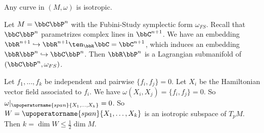   \begin{example}
    Any curve in $(M, \omega)$ is isotropic.
  \end{example}

  \begin{example}
    Let $M = \bbC\bbP^n$ with the Fubini-Study symplectic form $\omega_{FS}$.
    Recall that $\bbC\bbP^n$ parametrizes complex lines in $\bbC^{n+1}$.
    We have an embedding $\bbR^{n+1} \hookrightarrow \bbR^{n+1} \ten_\bbR \bbC = \bbC^{n+1}$, which induces an embedding $\bbR\bbP^n \hookrightarrow \bbC\bbP^n$.
    Then $\bbR\bbP^n$ is a Lagrangian submanifold of $(\bbC\bbP^n, \omega_{FS})$.
  \end{example}

  Let $f_1, \ldots, f_k$ be independent and pairwise $\{f_i, f_j\} = 0$.
  Let $X_i$ be the Hamiltonian vector field associated to $f_i$.
  We have $\omega(X_i, X_j) = \{f_i, f_j\} = 0$.
  So $\omega|_{\upoperatorname{span}\{X_1, \ldots, X_k\}} = 0$.
  So $W = \upoperatorname{span}\{X_1, \ldots, X_k\}$ is an isotropic subspace of $T_p M$.
  Then $k = \dim W \leq \frac{1}{2} \dim M$.









